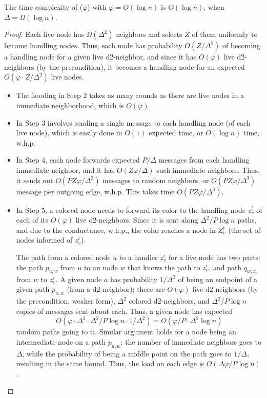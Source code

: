 \begin{theorem}
The time complexity of ($\varphi$) with $\varphi=O(\log n)$ is $O(\log n)$, when $\Delta = \Omega(\log n)$.
\label{T:learnpalette}
\end{theorem}
\iffalse %
\begin{proof}
Each live node has $\Omega(\Delta^2)$ neighbors and selects $Z$ of them uniformly to become handling nodes. Thus, each node has probability $O(Z/\Delta^2)$ of becoming a handling node for a given live d2-neighbor, and since it has $O(\varphi)$ live d2-neighbors (by the precondition), it becomes a handling node for an expected $O(\varphi \cdot Z/\Delta^2)$ live nodes. 
\begin{itemize}
\item The flooding in Step 2 takes as many rounds as there are live nodes in a immediate neighborhood, which is $O(\varphi)$.
\item In Step 3 involves sending a single message to each handling node (of each live node), which is easily done in $O(1)$ expected time, or $O(\log n)$ time, w.h.p.
\item In Step 4, each node forwards expected $P/\Delta$ messages from each handling immediate neighbor, and it has $O(Z\varphi/\Delta)$ such immediate neighbors. 
Thus, it sends out $O(P Z\varphi/\Delta^2)$ messages to random neighbors, or $O(P Z \varphi/\Delta^3)$ message per outgoing edge, w.h.p. This takes time $O(PZ \varphi/\Delta^3)$. 
\item In Step 5, a colored node needs to forward its color to the handling node $z_v^i$ of each of its $O(\varphi)$ live d2-neighbors. Since it is sent along $\Delta^2/P \log n$ paths, and due to the conductance,  w.h.p., the color reaches a node in $Z_v^i$ (the set of nodes informed of $z_v^i$). 

The path from a colored node $u$ to a handler $z_v^i$ for a live node has two parts: the path $p_{u,w}$ from $u$ to an node $w$ that knows the path to $z_v^i$, and path $q_{w,z_v^i}$ from $w$ to $z_v^i$. 
A given node $a$ has probability $1/\Delta^2$ of being an endpoint of a given path $p_{u,w}$ (from a d2-neighbor); there are $O(\varphi)$ live d2-neighbors (by the precondition, weaker form), $\Delta^2$ colored d2-neighbors, and $\Delta^2/P \log n$ copies of messages sent about each. Thus, a given node has expected 
\[ O(\varphi \cdot \Delta^2 \cdot \Delta^2/P \log n \cdot 1/\Delta^2) = O(\varphi/P \cdot \Delta^2 \log n) \] 
random paths going to it.
Similar argument holds for a node being an intermediate node on a path $p_{u,w}$: the number of immediate neighbors goes to $\Delta$, while the probability of being a middle point on the path goes to $1/\Delta$, resulting in the same bound.
Thus, the load on each edge is $O(\Delta \varphi/P \log n)$. 


\end{itemize}
\end{proof}
